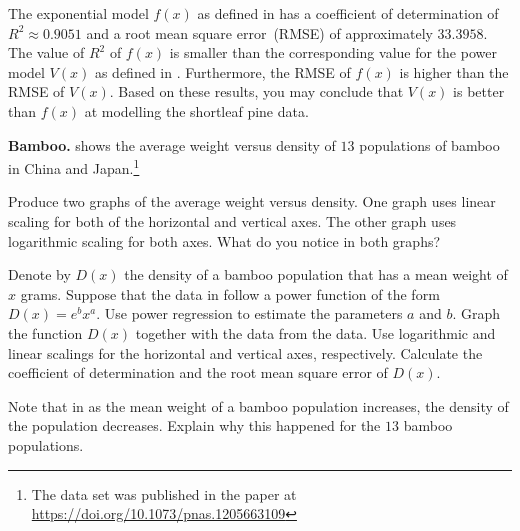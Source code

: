\documentclass[a4paper,oneside,12pt]{article}
\begin{document}
{\begin{solution}
The exponential model $f(x)$ as defined in
 has a
coefficient of determination of $R^2 \approx 0.9051$ and a root mean
square error~(RMSE) of approximately $33.3958$.  The value of $R^2$ of
$f(x)$ is smaller than the corresponding value for the power model
$V(x)$ as defined in .
Furthermore, the RMSE of $f(x)$ is higher than the RMSE of $V(x)$.
Based on these results, you may conclude that $V(x)$ is better than
$f(x)$ at modelling the shortleaf pine data.
\end{solution}
}{}

\begin{table}[!htbp]
\centering

\caption{%
  The average weight versus density of $13$ populations of bamboo.
  Each average weight is measured in grams and is the mean of the
  weight of the shoots of a bamboo population.  The density of a
  population of bamboo is defined as the number of bamboo shoots per
  square metre.
}
\label{tab:logarithm:bamboo}
\end{table}

\begin{exercise}
\textbf{Bamboo.}
 shows the average weight versus density
of $13$ populations of bamboo in China and Japan.\footnote{
  The data set was published in the paper at
  \url{https://doi.org/10.1073/pnas.1205663109}
}
\begin{packedenum}
\item\label{subex:logarithm:bamboo_linear_log}
  Produce two graphs of the average weight versus density.  One graph
  uses linear scaling for both of the horizontal and vertical axes.
  The other graph uses logarithmic scaling for both axes.  What do you
  notice in both graphs?

\item\label{subex:logarithm:bamboo_power_regression}
  Denote by $D(x)$ the density of a bamboo population that has a mean
  weight of $x$ grams.  Suppose that the data in
   follow a power function of the form
  $D(x) = e^b x^a$.  Use power regression to estimate the parameters
  $a$ and $b$.  Graph the function $D(x)$ together with the data from
  the data.  Use logarithmic and linear scalings for the horizontal
  and vertical axes, respectively.  Calculate the coefficient of
  determination and the root mean square error of $D(x)$.

\item\label{subex:logarithm:bamboo_explain}
  Note that in  as the mean weight of a
  bamboo population increases, the density of the population
  decreases.  Explain why this happened for the $13$ bamboo
  populations.
\end{packedenum}
\end{exercise}
\end{document}

